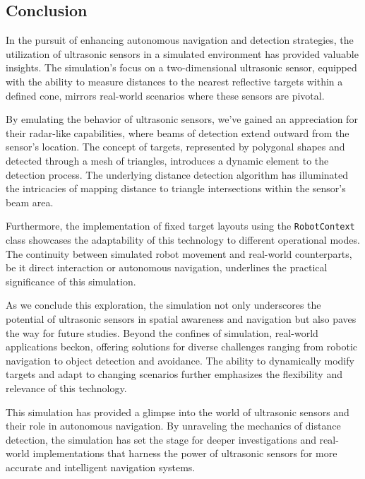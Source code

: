 \subsection{Conclusion}

In the pursuit of enhancing autonomous navigation and detection strategies, the utilization of ultrasonic sensors in a simulated environment has provided valuable insights. The simulation's focus on a two-dimensional ultrasonic sensor, equipped with the ability to measure distances to the nearest reflective targets within a defined cone, mirrors real-world scenarios where these sensors are pivotal.

By emulating the behavior of ultrasonic sensors, we've gained an appreciation for their radar-like capabilities, where beams of detection extend outward from the sensor's location. The concept of targets, represented by polygonal shapes and detected through a mesh of triangles, introduces a dynamic element to the detection process. The underlying distance detection algorithm has illuminated the intricacies of mapping distance to triangle intersections within the sensor's beam area.

Furthermore, the implementation of fixed target layouts using the \texttt{RobotContext} class showcases the adaptability of this technology to different operational modes. The continuity between simulated robot movement and real-world counterparts, be it direct interaction or autonomous navigation, underlines the practical significance of this simulation.

As we conclude this exploration, the simulation not only underscores the potential of ultrasonic sensors in spatial awareness and navigation but also paves the way for future studies. Beyond the confines of simulation, real-world applications beckon, offering solutions for diverse challenges ranging from robotic navigation to object detection and avoidance. The ability to dynamically modify targets and adapt to changing scenarios further emphasizes the flexibility and relevance of this technology.

This simulation has provided a glimpse into the world of ultrasonic sensors and their role in autonomous navigation. By unraveling the mechanics of distance detection, the simulation has set the stage for deeper investigations and real-world implementations that harness the power of ultrasonic sensors for more accurate and intelligent navigation systems.
